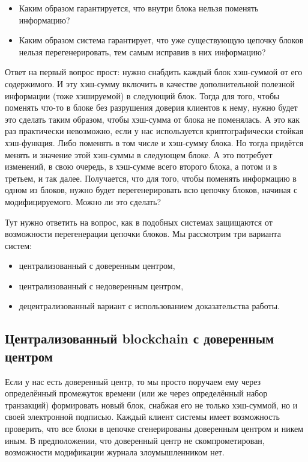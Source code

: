 \begin{itemize}
	\item Каким образом гарантируется, что внутри блока нельзя поменять информацию?
	\item Каким образом система гарантирует, что уже существующую цепочку блоков нельзя перегенерировать, тем самым исправив в них информацию?
\end{itemize}

Ответ на первый вопрос прост: нужно снабдить каждый блок хэш-суммой от его содержимого. И эту хэш-сумму включить в качестве дополнительной полезной информации (тоже хэшируемой) в следующий блок. Тогда для того, чтобы поменять что-то в блоке без разрушения доверия клиентов к нему, нужно будет это сделать таким образом, чтобы хэш-сумма от блока не поменялась. А это как раз практически невозможно, если у нас используется криптографически стойкая хэш-функция. Либо поменять в том числе и хэш-сумму блока. Но тогда придётся менять и значение этой хэш-суммы в следующем блоке. А это потребует изменений, в свою очередь, в хэш-сумме всего второго блока, а потом и в третьем, и так далее. Получается, что для того, чтобы поменять информацию в одном из блоков, нужно будет перегенерировать всю цепочку блоков, начиная с модифицируемого. Можно ли это сделать?

Тут нужно ответить на вопрос, как в подобных системах защищаются от возможности перегенерации цепочки блоков. Мы рассмотрим три варианта систем:

\begin{itemize}
	\item централизованный с доверенным центром,
	\item централизованный с недоверенным центром,
	\item децентрализованный вариант с использованием доказательства работы.
\end{itemize}

\subsection{Централизованный blockchain с доверенным центром}

Если у нас есть доверенный центр, то мы просто поручаем ему через определённый промежуток времени (или же через определённый набор транзакций) формировать новый блок, снабжая его не только хэш-суммой, но и своей электронной подписью. Каждый клиент системы имеет возможность проверить, что все блоки в цепочке сгенерированы доверенным центром и никем иным. В предположении, что доверенный центр не скомпрометирован, возможности модификации журнала злоумышленником нет.

